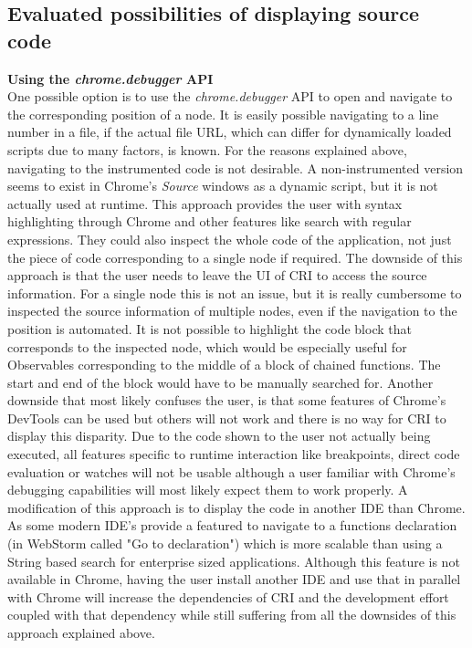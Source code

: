 \subsection{Evaluated possibilities of displaying source code}
\textbf{Using the \emph{chrome.debugger} API}\\
One possible option is to use the \emph{chrome.debugger} API to open and navigate to the corresponding position of a node. It is easily possible navigating to a line number in a file, if the actual file URL, which can differ for dynamically loaded scripts due to many factors, is known. For the reasons explained above, navigating to the instrumented code is not desirable. A non-instrumented version seems to exist in Chrome's \emph{Source} windows as a dynamic script, but it is not actually used at runtime. This approach provides the user with syntax highlighting through Chrome and other features like search with regular expressions. They could also inspect the whole code of the application, not just the piece of code corresponding to a single node if required. The downside of this approach is that the user needs to leave the UI of CRI to access the source information. For a single node this is not an issue, but it is really cumbersome to inspected the source information of multiple nodes, even if the navigation to the position is automated. It is not possible to highlight the code block that corresponds to the inspected node, which would be especially useful for Observables corresponding to the middle of a block of chained functions. The start and end of the block would have to be manually searched for. Another downside that most likely confuses the user, is that some features of Chrome's DevTools can be used but others will not work and there is no way for CRI to display this disparity. Due to the code shown to the user not actually being executed, all features specific to runtime interaction like breakpoints, direct code evaluation or watches will not be usable although a user familiar with Chrome's debugging capabilities will most likely expect them to work properly. A modification of this approach is to display the code in another IDE than Chrome. As some modern IDE's provide a featured to navigate to a functions declaration (in WebStorm called "Go to declaration") which is more scalable than using a String based search for enterprise sized applications. Although this feature is not available in Chrome, having the user install another IDE and use that in parallel with Chrome will increase the dependencies of CRI and the development effort coupled with that dependency while still suffering from all the downsides of this approach explained above.\\

